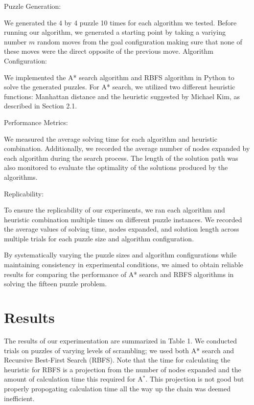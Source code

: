 \documentclass{article}
\begin{document}
{Puzzle Generation:}

We generated the 4 by 4 puzzle 10 times for each algorithm we tested. Before running our algorithm, we generated a starting point by taking a variying number $m$ random moves from the goal configuration making sure that none of these moves were the direct opposite of the previous move. 
Algorithm Configuration:

We implemented the A* search algorithm and RBFS algorithm in Python to solve the generated puzzles.
For A* search, we utilized two different heuristic functions: Manhattan distance and the heuristic suggested by Michael Kim, as described in Section 2.1.

Performance Metrics:

We measured the average solving time for each algorithm and heuristic combination.
Additionally, we recorded the average number of nodes expanded by each algorithm during the search process.
The length of the solution path was also monitored to evaluate the optimality of the solutions produced by the algorithms.

Replicability:

To ensure the replicability of our experiments, we ran each algorithm and heuristic combination multiple times on different puzzle instances.
We recorded the average values of solving time, nodes expanded, and solution length across multiple trials for each puzzle size and algorithm configuration.
 
By systematically varying the puzzle sizes and algorithm configurations while maintaining consistency in experimental conditions, we aimed to obtain reliable results for comparing the performance of A* search and RBFS algorithms in solving the fifteen puzzle problem.

\section{Results}
The results of our experimentation are summarized in Table 1. We conducted trials on puzzles of varying levels of scrambling; we used both A* search and Recursive Best-First Search (RBFS). Note that the time for calculating the heuristic for RBFS is a projection from the number of nodes expanded and the amount of calculation time this required for A$^*$. This projection is not good but properly propogating calculation time all the way up the chain was deemed inefficient. 
\end{document}
